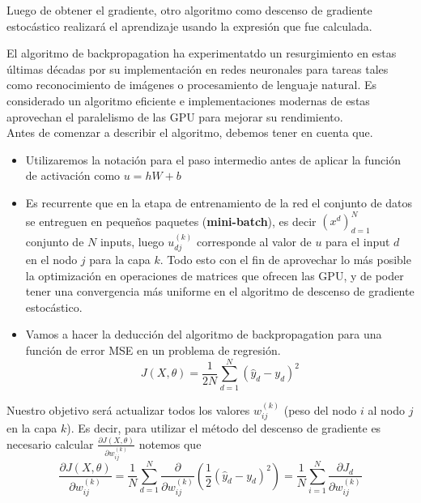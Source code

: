 Luego de obtener el gradiente, otro algoritmo como descenso de gradiente estocástico realizará el aprendizaje usando la expresión que fue calculada. 

El algoritmo de backpropagation ha experimentatdo un resurgimiento en estas últimas décadas por su implementación en redes neuronales para tareas tales como reconocimiento de imágenes o procesamiento de lenguaje natural. 
Es considerado un algoritmo eficiente e implementaciones modernas de estas aprovechan el paralelismo de las GPU para mejorar su rendimiento. \\

Antes de comenzar a describir el algoritmo, debemos tener en cuenta que.   
\begin{itemize}

	\item Utilizaremos la notación para el paso intermedio antes de aplicar la función de activación como $u = hW + b$
  
	\item Es recurrente que en la etapa de entrenamiento de la red el conjunto de datos se entreguen en pequeños paquetes (\textbf{mini-batch}), es decir $(x^d)_{d=1}^N$  conjunto de $N$ inputs, luego $u_{dj}^{(k)}$ corresponde al valor de $u$ para el input $d$ en el nodo $j$ para la capa $k$. Todo esto con el fin de aprovechar lo más posible la optimización en operaciones de matrices que ofrecen las GPU, y de poder tener una convergencia más uniforme en el algoritmo de descenso  de gradiente estocástico.

   
   \item Vamos a hacer la deducción del algoritmo de backpropagation para una función de error MSE en un problema de regresión.
   \[
	J(X ,\theta) = \frac{1}{2N}\sum_{d=1}^N(\hat{y}_d-y_d)^2
	\]	
  
\end{itemize} 

Nuestro objetivo será actualizar todos los valores $w_{ij}^{(k)}$ (peso del nodo $i$ al nodo $j$ en la capa $k$). Es decir, para utilizar el método del descenso de gradiente es necesario calcular $\frac{\partial J(X , \theta) }{\partial w_{ij}^{(k)}}$ notemos que 
\[
\frac{\partial J(X , \theta) }{\partial w_{ij}^{(k)}} = \frac{1}{N}\sum_{d=1}^N \frac{\partial}{\partial w_{ij}^{(k)}} \left ( \frac{1}{2}(\hat{y}_d-y_d)^2 \right) = \frac{1}{N}\sum_{i=1}^N \frac{\partial J_d}{\partial w_{ij}^{(k)}}
\]

